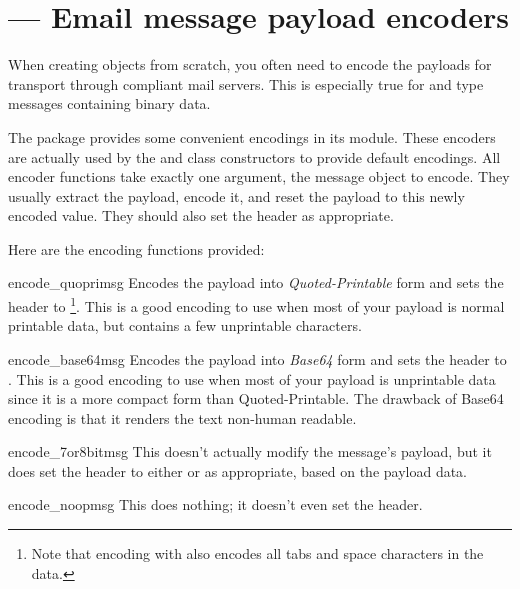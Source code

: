 \section{ ---
         Email message payload encoders}



When creating  objects from scratch, you often need to
encode the payloads for transport through compliant mail servers.
This is especially true for  and  type
messages containing binary data.

The  package provides some convenient encodings in its
 module.  These encoders are actually used by the
 and  class constructors to provide default
encodings.  All encoder functions take exactly one argument, the
message object to encode.  They usually extract the payload, encode
it, and reset the payload to this newly encoded value.  They should also
set the  header as appropriate.

Here are the encoding functions provided:

\begin{funcdesc}{encode_quopri}{msg}
Encodes the payload into \emph{Quoted-Printable} form and sets the
 header to
\footnote{Note that encoding with
 also encodes all tabs and space characters in
the data.}.
This is a good encoding to use when most of your payload is normal
printable data, but contains a few unprintable characters.
\end{funcdesc}

\begin{funcdesc}{encode_base64}{msg}
Encodes the payload into \emph{Base64} form and sets the
 header to
.  This is a good encoding to use when most of your payload
is unprintable data since it is a more compact form than
Quoted-Printable.  The drawback of Base64 encoding is that it
renders the text non-human readable.
\end{funcdesc}

\begin{funcdesc}{encode_7or8bit}{msg}
This doesn't actually modify the message's payload, but it does set
the  header to either  or
 as appropriate, based on the payload data.
\end{funcdesc}

\begin{funcdesc}{encode_noop}{msg}
This does nothing; it doesn't even set the
 header.
\end{funcdesc}
